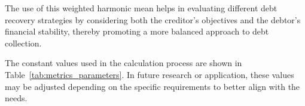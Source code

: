The use of this weighted harmonic mean helps in evaluating different debt recovery strategies by considering both the creditor’s objectives and the debtor’s financial stability, thereby promoting a more balanced approach to debt collection.

The constant values used in the calculation process are shown in Table~\ref{tab:metrics_parameters}. In future research or application, these values may be adjusted depending on the specific requirements to better align with the needs.
\begin{table}[ht]
\centering
\caption{Constants used in Average Metric Calculation.}
\label{tab:metrics_parameters}
\end{table}